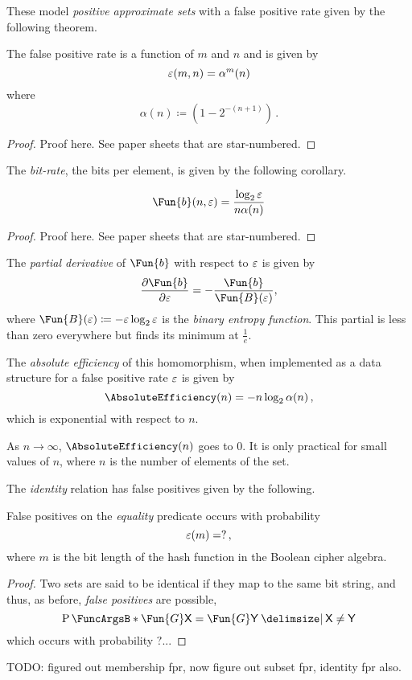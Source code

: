 \documentclass[ ../main.tex]{subfiles}
\begin{document}
These model \emph{positive approximate sets} with a false positive rate given by the following theorem.
\begin{theorem}
The false positive rate is a function of $m$ and $n$ and is given by
\begin{equation}
	\varepsilon(m,n) = \alpha^m(n)
\end{equation}
where
\begin{equation}
	\alpha(n) \coloneqq \left(1-2^{-(n+1)}\right)\,.
\end{equation}
\end{theorem}
\begin{proof}
Proof here. See paper sheets that are star-numbered.
\end{proof}


The \emph{bit-rate}, the bits per element, is given by the following corollary.
\begin{corollary}
\begin{equation}
	\Fun{b}(n,\fprate) = \frac{\log_2 \fprate}{ n \alpha(n)}
\end{equation}
\end{corollary}
\begin{proof}
Proof here. See paper sheets that are star-numbered.
\end{proof}

The \emph{partial derivative} of $\Fun{b}$ with respect to $\varepsilon$ is given by
\begin{equation}
	\frac{\partial{\Fun{b}}}{\partial \fprate} = -\frac{\Fun{b}}{\Fun{B}(\fprate)},
\end{equation}
where $\Fun{B}(\fprate) \coloneqq -\fprate \log_2 \fprate$ is the \emph{binary entropy function}.
This partial is less than zero everywhere but finds its minimum at $\frac{1}{e}$.

The \emph{absolute efficiency} of this homomorphism, when implemented as a data structure for a false positive rate $\varepsilon$ is given by
\begin{equation}
	\AbsoluteEfficiency(n) = -n \log_2 \alpha(n)\,,
\end{equation}
which is exponential with respect to $n$.

As $n \to \infty$, $\AbsoluteEfficiency(n)$ goes to $0$.
It is only practical for small values of $n$, where $n$ is the number of elements of the set.

The \emph{identity} relation has false positives given by the following.
\begin{theorem}
	False positives on the \emph{equality} predicate occurs with probability
	\begin{equation}
	\varepsilon(m) = ?\,,
	\end{equation}
	where $m$ is the bit length of the hash function in the Boolean cipher algebra.
\end{theorem}
\begin{proof}
	Two sets are said to be identical if they map to the same bit string, and thus, as before, \emph{false positives} are possible,
	\begin{equation}
	\Prob{\Fun{G} \Set{X} = \Fun{G} \Set{Y} \Given \Set{X} \neq \Set{Y}}
	\end{equation}
	which occurs with probability $?$...
\end{proof}


TODO: figured out membership fpr, now figure out subset fpr, identity fpr also.
\end{document}
